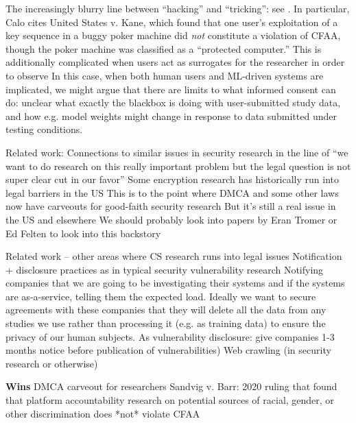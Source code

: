 \begin{outline}
\1 The increasingly blurry line between ``hacking'' and ``tricking'': see \cite{calo2018}. In particular, Calo cites United States v. Kane, which found that one user's exploitation of a key sequence in a buggy poker machine did \textit{not} constitute a violation of CFAA, though the poker machine was classified as a ``protected computer.''
\2 This is additionally complicated when users act as surrogates for the researcher in order to observe 
\2 In this case, when both human users and ML-driven systems are implicated, we might argue that there are limits to what informed consent can do: unclear what exactly the blackbox is doing with user-submitted study data, and how e.g. model weights might change in response to data submitted under testing conditions. 

\1 Related work: Connections to similar issues in security research in the line of “we want to do research on this really important problem but the legal question is not super clear cut in our favor”
\2 Some encryption research has historically run into legal barriers in the US
\2 This is to the point where DMCA and some other laws now have carveouts for good-faith security research
\2 But it’s still a real issue in the US and elsewhere
\2 We should probably look into papers by Eran Tromer or Ed Felten to look into this backstory

\1 Related work – other areas where CS research runs into legal issues
\2 Notification + disclosure practices as in typical security vulnerability research
\2 Notifying companies that we are going to be investigating their systems and if the systems are as-a-service, telling them the expected load.
\2 Ideally we want to secure agreements with these companies that they will delete all the data from any studies we use rather than processing it (e.g. as training data) to ensure the privacy of our human subjects.
\2 As vulnerability disclosure: give companies 1-3 months notice before publication of vulnerabilities)
\2 Web crawling (in security research or otherwise)

\1 \textbf{Wins}
\2 DMCA carveout for researchers 
\2 Sandvig v. Barr: 2020 ruling that found that platform accountability research on potential sources of racial, gender, or other discrimination does *not* violate CFAA
\2 
\end{outline}


